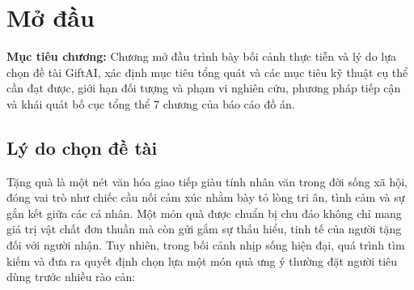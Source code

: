 
\chapter{Mở đầu}
\label{ch:modau}

\begin{infobox}
\textbf{Mục tiêu chương:}
Chương mở đầu trình bày bối cảnh thực tiễn và lý do lựa chọn đề tài GiftAI, xác định mục tiêu tổng quát và các mục tiêu kỹ thuật cụ thể cần đạt được, giới hạn đối tượng và phạm vi nghiên cứu, phương pháp tiếp cận và khái quát bố cục tổng thể 7 chương của báo cáo đồ án.
\end{infobox}


\section{Lý do chọn đề tài}

Tặng quà là một nét văn hóa giao tiếp giàu tính nhân văn trong đời sống xã hội, đóng vai trò như chiếc cầu nối cảm xúc nhằm bày tỏ lòng tri ân, tình cảm và sự gắn kết giữa các cá nhân. Một món quà được chuẩn bị chu đáo không chỉ mang giá trị vật chất đơn thuần mà còn gửi gắm sự thấu hiểu, tinh tế của người tặng đối với người nhận. Tuy nhiên, trong bối cảnh nhịp sống hiện đại, quá trình tìm kiếm và đưa ra quyết định chọn lựa một món quà ưng ý thường đặt người tiêu dùng trước nhiều rào cản:


